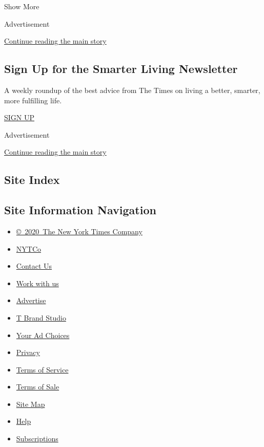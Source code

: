Show More

Advertisement

\protect\hyperlink{after-mid2}{Continue reading the main story}

\hypertarget{sign-up-for-the-smarter-living-newsletter}{%
\subsection{Sign Up for the Smarter Living
Newsletter}\label{sign-up-for-the-smarter-living-newsletter}}

A weekly roundup of the best advice from The Times on living a better,
smarter, more fulfilling life.

\href{/newsletters/signup/SL}{SIGN UP}

Advertisement

\protect\hyperlink{after-mktg}{Continue reading the main story}

\hypertarget{site-index}{%
\subsection{Site Index}\label{site-index}}

\hypertarget{site-information-navigation}{%
\subsection{Site Information
Navigation}\label{site-information-navigation}}

\begin{itemize}
\tightlist
\item
  \href{https://help.nytimes.com/hc/en-us/articles/115014792127-Copyright-notice}{©~2020~The
  New York Times Company}
\end{itemize}

\begin{itemize}
\tightlist
\item
  \href{https://www.nytco.com/}{NYTCo}
\item
  \href{https://help.nytimes.com/hc/en-us/articles/115015385887-Contact-Us}{Contact
  Us}
\item
  \href{https://www.nytco.com/careers/}{Work with us}
\item
  \href{https://nytmediakit.com/}{Advertise}
\item
  \href{http://www.tbrandstudio.com/}{T Brand Studio}
\item
  \href{https://www.nytimes.com/privacy/cookie-policy\#how-do-i-manage-trackers}{Your
  Ad Choices}
\item
  \href{https://www.nytimes.com/privacy}{Privacy}
\item
  \href{https://help.nytimes.com/hc/en-us/articles/115014893428-Terms-of-service}{Terms
  of Service}
\item
  \href{https://help.nytimes.com/hc/en-us/articles/115014893968-Terms-of-sale}{Terms
  of Sale}
\item
  \href{https://spiderbites.nytimes.com}{Site Map}
\item
  \href{https://help.nytimes.com/hc/en-us}{Help}
\item
  \href{https://www.nytimes.com/subscription?campaignId=37WXW}{Subscriptions}
\end{itemize}
